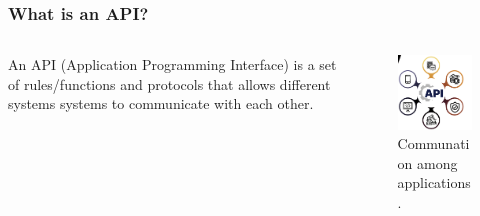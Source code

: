 \documentclass[aspectratio=169]{beamer}
\begin{document}
\begin{frame}[plain]
    
\end{frame}



\begin{frame}
    \frametitle{What is an API?}
    \begin{columns}
        \begin{column}{0.6\textwidth}
            An API (Application Programming Interface) is a set of rules/functions and protocols that allows different systems systems to communicate with each other.
        \end{column}
        \begin{column}{0.4\textwidth}
            \begin{figure}
                \includegraphics[width=\linewidth]{./images/api_cover.png}
                \caption{Communation among applications.}
            \end{figure}
        \end{column}
    \end{columns}
\end{frame}
\end{document}
